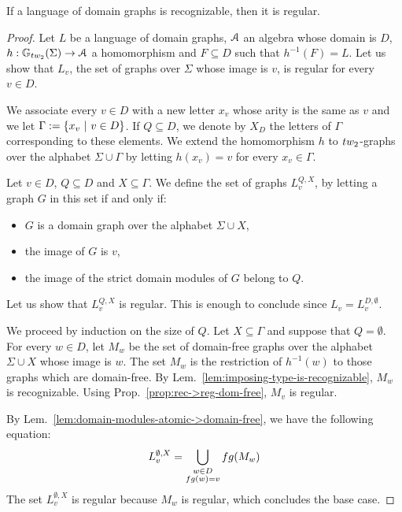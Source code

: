 \begin{proposition}\label{prop:rec->reg-dom}
If a language of domain graphs is recognizable, then it is regular.
\end{proposition}
\begin{proof}
Let $L$ be a language of domain graphs, $\mathcal A$ an algebra whose domain is $D$, $h:\mathbb{G}_\TWT(\Sigma) \to \A$ a homomorphism and $F\subseteq D$ such that $h^{-1}(F)=L$. Let us show that $L_v$, the set of graphs over $\Sigma$ whose image  is $v$,  is regular for every $v\in D$. 
\medskip

We associate every $v\in D$ with a new letter $x_v$ whose arity is the same as $v$ and we let  $\Gamma:=\left\{x_v\ | \ v\in D\right\}$. If $Q\subseteq D$, we denote by $X_D$ the letters of $\Gamma$ corresponding to these elements.   We extend the homomorphism $h$ to $\TWT$-graphs over the alphabet $\Sigma \cup \Gamma$ by letting $h(x_v)=v$ for every $x_v\in\Gamma$. 
\medskip

Let $v\in D$, $Q\subseteq D$ and $X\subseteq \Gamma$.  We define the set of graphs $L^{Q,X}_{v}$, by letting a graph $G$ in this set  if and only if:
\begin{itemize}
\item $G$ is a domain graph over the alphabet $\Sigma\cup X$, 
\item the image of $G$ is $v$,
\item  the image of the strict domain modules of $G$ belong to $Q$.
\end{itemize}


 Let us show that $L^{Q,X}_v$ is regular. This is enough to conclude since $L_v=L^{D,\emptyset}_v$.
\medskip

 We proceed by induction on the size of $Q$. Let $X\subseteq \Gamma$ and suppose that $Q=\emptyset$. For every $w\in D$, let $M_w$ be the set of domain-free graphs over the alphabet $\Sigma\cup X$ whose image is $w$.  The set $M_w$ is the restriction of $h^{-1}(w)$ to those graphs which are domain-free. By Lem.~\ref{lem:imposing-type-is-recognizable}, $M_w$ is recognizable. Using Prop.~\ref{prop:rec->reg-dom-free}, $M_v$ is regular. 
 \medskip
 
 By Lem.~\ref{lem:domain-modules-atomic->domain-free}, we have the following equation:
$$ L^{\emptyset, X}_v= \bigcup_{\substack{w\in D\\ \dom(w)=v}}\dom(M_w)$$
The set  $ L^{\emptyset, X}_v$ is regular because $M_w$ is regular, which concludes the base case.  
\medskip
 

\end{proof}
